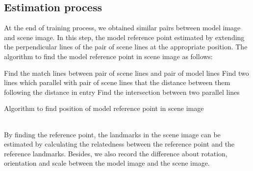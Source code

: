 \subsection{Estimation process}
At the end of training process, we obtained similar pairs between model image and scene image. In this step, the model reference point estimated by extending the perpendicular lines of the pair of scene lines at the appropriate position. The algorithm to find the model reference point in scene image as follows: \\[0.2cm]
\begin{algorithm}[H]
\Indm 
{}
\SetAlgoLined
{}
\Indp
Find the match lines between pair of scene lines and pair of model lines\;
Find two lines which parallel with pair of scene lines that the distance between them following the distance in entry\;
Find the intersection between two parallel lines\;
\caption{Algorithm to find position of model reference point in scene image}
\end{algorithm}~\\[0.2cm]
By finding the reference point, the landmarks in the scene image can be estimated by calculating the relatedness between the reference point and the reference landmarks. Besides, we also record the difference about rotation, orientation and scale between the model image and the scene image.
